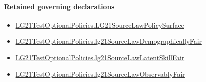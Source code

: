 \documentclass[10pt]{article}
\begin{document}
\paragraph{Retained governing declarations}
\begin{itemize}\raggedright
\item \hyperlink{governing-declaration-48965123e52b8b0f}{LG21\allowbreak{}Test\allowbreak{}Optional\allowbreak{}Policies.\allowbreak{}LG21\allowbreak{}Source\allowbreak{}Law\allowbreak{}Policy\allowbreak{}Surface}
\item \hyperlink{paper-prerequisite-051c0554c55aebdb}{LG21\allowbreak{}Test\allowbreak{}Optional\allowbreak{}Policies.\allowbreak{}lg21\allowbreak{}Source\allowbreak{}Law\allowbreak{}Demographically\allowbreak{}Fair}
\item \hyperlink{paper-prerequisite-29470906bfc1caef}{LG21\allowbreak{}Test\allowbreak{}Optional\allowbreak{}Policies.\allowbreak{}lg21\allowbreak{}Source\allowbreak{}Law\allowbreak{}Latent\allowbreak{}Skill\allowbreak{}Fair}
\item \hyperlink{paper-prerequisite-a01f7afb43c09d7e}{LG21\allowbreak{}Test\allowbreak{}Optional\allowbreak{}Policies.\allowbreak{}lg21\allowbreak{}Source\allowbreak{}Law\allowbreak{}Observably\allowbreak{}Fair}
\end{itemize}
\end{document}
